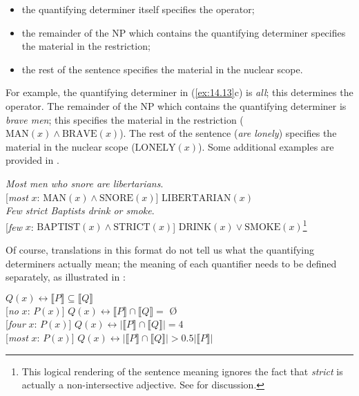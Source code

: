 {\begin{itemize}
\item the quantifying determiner itself specifies the operator;
\item the remainder of the NP which contains the quantifying determiner specifies the material in the restriction;
\item the rest of the sentence specifies the material in the nuclear scope.
\end{itemize}

For example, the quantifying determiner in (\ref{ex:14.13}c) is \textit{all}; this determines the operator. The remainder of the NP which contains the quantifying determiner is \textit{brave men}; this specifies the material in the restriction ($\text{MAN}(x) \wedge \text{BRAVE}(x)$). The rest of the sentence (\textit{are lonely}) specifies the material in the nuclear scope ($\text{LONELY}(x)$). Some additional examples are provided in .


\ea \label{ex:14.14}
\ea  \textit{Most men who snore are libertarians}.\\
  {}[\textit{most} $x$: $\text{MAN}(x) \wedge \text{SNORE}(x)$] $\text{LIBERTARIAN}(x)$\\
\ex \textit{Few strict Baptists drink or smoke}.\\
  {}[\textit{few} $x$: $\text{BAPTIST}(x) \wedge \text{STRICT}(x)$] $\text{DRINK}(x) \vee \text{SMOKE}(x)$\footnote{This logical rendering of the sentence meaning ignores the fact that \textit{strict} is actually a non-intersective adjective. See  for discussion.}
   \z
\z


Of course, translations in this format do not tell us what the quantifying determiners actually mean; the meaning of each quantifier needs to be defined separately, as illustrated in :


\ea \label{ex:14.15}
\ea {} $Q(x)  \leftrightarrow   \llbracket P\rrbracket  \subseteq \llbracket Q \rrbracket$ \\
\ex{} [\textit{no} $x$: $P(x)$] $Q(x)  \leftrightarrow   \llbracket P \rrbracket \cap \llbracket Q \rrbracket =$ Ø \\
\ex{} [\textit{four} $x$: $P(x)$] $Q(x) \leftrightarrow   | \llbracket P \rrbracket \cap \llbracket Q \rrbracket| =  4$\\
\ex{} [\textit{most} $x$: $P(x)$] $Q(x)  \leftrightarrow  | \llbracket P \rrbracket \cap \llbracket Q \rrbracket | >  0.5 |\llbracket P \rrbracket|$
     \z
\z


}
